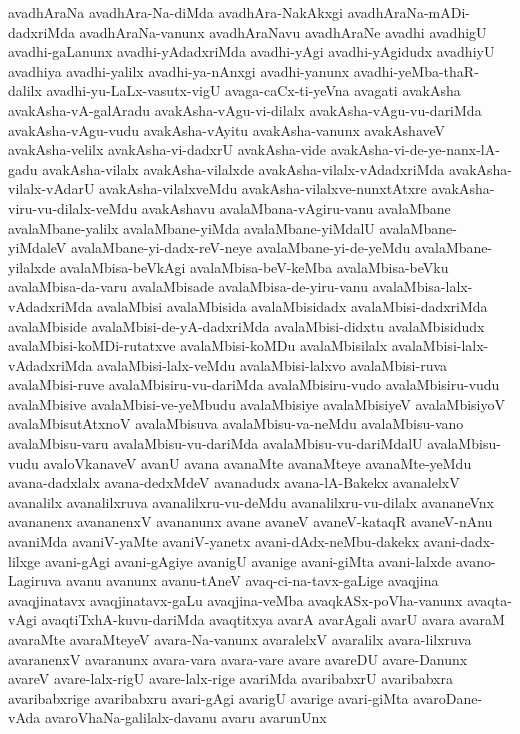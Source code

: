 {avadhAraNa
avadhAra-Na-diMda
avadhAra-NakAkxgi
avadhAraNa-mADi-dadxriMda
avadhAraNa-vanunx
avadhAraNavu
avadhAraNe
avadhi
avadhigU
avadhi-gaLanunx
avadhi-yAdadxriMda
avadhi-yAgi
avadhi-yAgidudx
avadhiyU
avadhiya
avadhi-yalilx
avadhi-ya-nAnxgi
avadhi-yanunx
avadhi-yeMba-thaR-dalilx
avadhi-yu-LaLx-vasutx-vigU
avaga-caCx-ti-yeVna
avagati
avakAsha
avakAsha-vA-galAradu
avakAsha-vAgu-vi-dilalx
avakAsha-vAgu-vu-dariMda
avakAsha-vAgu-vudu
avakAsha-vAyitu
avakAsha-vanunx
avakAshaveV
avakAsha-velilx
avakAsha-vi-dadxrU
avakAsha-vide
avakAsha-vi-de-ye-nanx-lA-gadu
avakAsha-vilalx
avakAsha-vilalxde
avakAsha-vilalx-vAdadxriMda
avakAsha-vilalx-vAdarU
avakAsha-vilalxveMdu
avakAsha-vilalxve-nunxtAtxre
avakAsha-viru-vu-dilalx-veMdu
avakAshavu
avalaMbana-vAgiru-vanu
avalaMbane
avalaMbane-yalilx
avalaMbane-yiMda
avalaMbane-yiMdalU
avalaMbane-yiMdaleV
avalaMbane-yi-dadx-reV-neye
avalaMbane-yi-de-yeMdu
avalaMbane-yilalxde
avalaMbisa-beVkAgi
avalaMbisa-beV-keMba
avalaMbisa-beVku
avalaMbisa-da-varu
avalaMbisade
avalaMbisa-de-yiru-vanu
avalaMbisa-lalx-vAdadxriMda
avalaMbisi
avalaMbisida
avalaMbisidadx
avalaMbisi-dadxriMda
avalaMbiside
avalaMbisi-de-yA-dadxriMda
avalaMbisi-didxtu
avalaMbisidudx
avalaMbisi-koMDi-rutatxve
avalaMbisi-koMDu
avalaMbisilalx
avalaMbisi-lalx-vAdadxriMda
avalaMbisi-lalx-veMdu
avalaMbisi-lalxvo
avalaMbisi-ruva
avalaMbisi-ruve
avalaMbisiru-vu-dariMda
avalaMbisiru-vudo
avalaMbisiru-vudu
avalaMbisive
avalaMbisi-ve-yeMbudu
avalaMbisiye
avalaMbisiyeV
avalaMbisiyoV
avalaMbisutAtxnoV
avalaMbisuva
avalaMbisu-va-neMdu
avalaMbisu-vano
avalaMbisu-varu
avalaMbisu-vu-dariMda
avalaMbisu-vu-dariMdalU
avalaMbisu-vudu
avaloVkanaveV
avanU
avana
avanaMte
avanaMteye
avanaMte-yeMdu
avana-dadxlalx
avana-dedxMdeV
avanadudx
avana-lA-Bakekx
avanalelxV
avanalilx
avanalilxruva
avanalilxru-vu-deMdu
avanalilxru-vu-dilalx
avananeVnx
avananenx
avananenxV
avananunx
avane
avaneV
avaneV-kataqR
avaneV-nAnu
avaniMda
avaniV-yaMte
avaniV-yanetx
avani-dAdx-neMbu-dakekx
avani-dadx-lilxge
avani-gAgi
avani-gAgiye
avanigU
avanige
avani-giMta
avani-lalxde
avano-Lagiruva
avanu
avanunx
avanu-tAneV
avaq-ci-na-tavx-gaLige
avaqjina
avaqjinatavx
avaqjinatavx-gaLu
avaqjina-veMba
avaqkASx-poVha-vanunx
avaqta-vAgi
avaqtiTxhA-kuvu-dariMda
avaqtitxya
avarA
avarAgali
avarU
avara
avaraM
avaraMte
avaraMteyeV
avara-Na-vanunx
avaralelxV
avaralilx
avara-lilxruva
avaranenxV
avaranunx
avara-vara
avara-vare
avare
avareDU
avare-Danunx
avareV
avare-lalx-rigU
avare-lalx-rige
avariMda
avaribabxrU
avaribabxra
avaribabxrige
avaribabxru
avari-gAgi
avarigU
avarige
avari-giMta
avaroDane-vAda
avaroVhaNa-galilalx-davanu
avaru
avarunUnx
}

